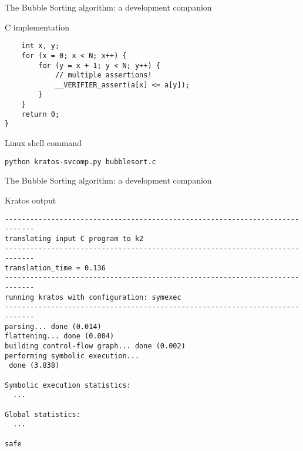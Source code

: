 \begin{frame}[fragile]{The Bubble Sorting algorithm: a development companion}
    \begin{block}{C implementation}
            \begin{verbatim}
    int x, y;
    for (x = 0; x < N; x++) {
        for (y = x + 1; y < N; y++) {
            // multiple assertions!
            __VERIFIER_assert(a[x] <= a[y]);
        }
    }
    return 0;
}
            \end{verbatim}
    \end{block}

    \pause

    \begin{block}{Linux shell command}
            \begin{verbatim}
python kratos-svcomp.py bubblesort.c
            \end{verbatim}
    \end{block}
\end{frame}

\begin{frame}[fragile]{The Bubble Sorting algorithm: a development companion}
    \begin{block}{Kratos output}
            \begin{verbatim}
-----------------------------------------------------------------------------
translating input C program to k2
-----------------------------------------------------------------------------
translation_time = 0.136
-----------------------------------------------------------------------------
running kratos with configuration: symexec
-----------------------------------------------------------------------------
parsing... done (0.014)
flattening... done (0.004)
building control-flow graph... done (0.002)
performing symbolic execution...
 done (3.838)

Symbolic execution statistics:
  ...

Global statistics:
  ...

safe
            \end{verbatim}
    \end{block}
\end{frame}